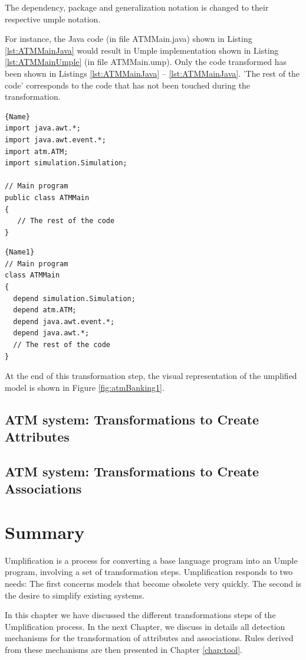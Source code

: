 The dependency, package and generalization notation is changed to their respective umple notation.

For instance, the Java code (in file ATMMain.java) shown in Listing  \ref{lst:ATMMainJava} would result in  Umple implementation shown in Listing  \ref{lst:ATMMainUmple} (in file ATMMain.ump). Only the code transformed has been shown in Listings \ref{lst:ATMMainJava} -- \ref{lst:ATMMainJava}. 'The rest of the code' corresponds to the code that has not been touched during the transformation. 

\noindent\begin{minipage}{.45\textwidth}
\begin{lstlisting}[style=java,caption=ATMMain.java,label=lst:ATMMainJava]{Name}
import java.awt.*;
import java.awt.event.*;
import atm.ATM;
import simulation.Simulation;

// Main program  
public class ATMMain
{
   // The rest of the code
}
\end{lstlisting}
\end{minipage}\hfill
\begin{minipage}{.45\textwidth}
\begin{lstlisting}[style=umpleIn,caption=ATMMain.ump,label=lst:ATMMainUmple]{Name1}
// Main program  
class ATMMain
{
  depend simulation.Simulation;
  depend atm.ATM;
  depend java.awt.event.*;
  depend java.awt.*;
  // The rest of the code
}
\end{lstlisting}
\end{minipage}

At the end of this transformation step, the visual representation of the umplified model is shown in Figure \ref{fig:atmBanking1}.

\subsection{ATM system: Transformations to Create Attributes}

\subsection{ATM system: Transformations to Create Associations}

\section{Summary}

Umplification is a process for converting a base language program into an Umple program, involving a set of transformation steps. Umplification responds to two needs: The first concerns models that become obsolete very quickly. The second is the desire to simplify existing systems.

In this chapter we have discussed the different transformations steps of the Umplification process. In the next Chapter, we discuss in details all detection mechanisms for the transformation of attributes and associations. 
Rules derived from these mechanisms are then presented in Chapter \ref{chap:tool}.
